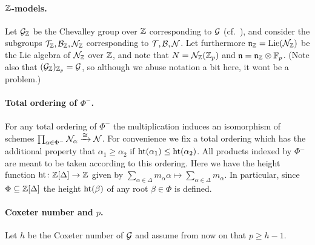 \paragraph{$\mathbb{Z}$-models.} Let $\mathcal{G}_{\mathbb{Z}}$ be the Chevalley group over $\mathbb{Z}$ corresponding to $\mathcal{G}$ (cf.\ \cite[§1]{Con}), and consider the subgroups $\mathcal{T}_{\mathbb{Z}},\mathcal{B}_{\mathbb{Z}},\mathcal{N}_{\mathbb{Z}}$ corresponding to $\mathcal{T},\mathcal{B},\mathcal{N}$. Let furthermore $\mathfrak{n}_{\mathbb{Z}} = \operatorname{Lie}(\mathcal{N}_{\mathbb{Z}})$ be the Lie algebra of $\mathcal{N}_{\mathbb{Z}}$ over $\mathbb{Z}$, and note that $N = \mathcal{N}_{\mathbb{Z}}(\mathbb{Z}_{p})$ and $\mathfrak{n} =  \mathfrak{n}_{\mathbb{Z}} \otimes \mathbb{F}_{p}$. (Note also that $(\mathcal{G}_{\mathbb{Z}})_{\mathbb{Z}_{p}} = \mathcal{G}$, so although we abuse notation a bit here, it wont be a problem.)

\paragraph{Total ordering of $\Phi^{-}$.} For any total ordering of $\Phi^-$ the multiplication induces an isomorphism of schemes $\prod_{\alpha \in \Phi^-} \mathcal{N}_\alpha \xrightarrow{\cong} \mathcal{N}$. For convenience we fix a total ordering which has the additional property that $\alpha_1 \geq \alpha_2$ if $\operatorname{ht}(\alpha_1) \leq \operatorname{ht}(\alpha_2)$. All products indexed by $\Phi^-$ are meant to be taken according to this ordering. Here we have the height function $\operatorname{ht} \colon \mathbb{Z}[\Delta] \to \mathbb{Z}$ given by $\sum_{\alpha \in \Delta} m_\alpha \alpha \mapsto \sum_{\alpha \in \Delta} m_\alpha$. In particular, since $\Phi \subseteq \mathbb{Z}[\Delta]$ the height $\operatorname{ht}(\beta)$ of any root $\beta \in \Phi$ is defined.

\paragraph{Coxeter number and $p$.} Let $h$ be the Coxeter number of $\mathcal{G}$ and assume from now on that $p \geq h-1$.

